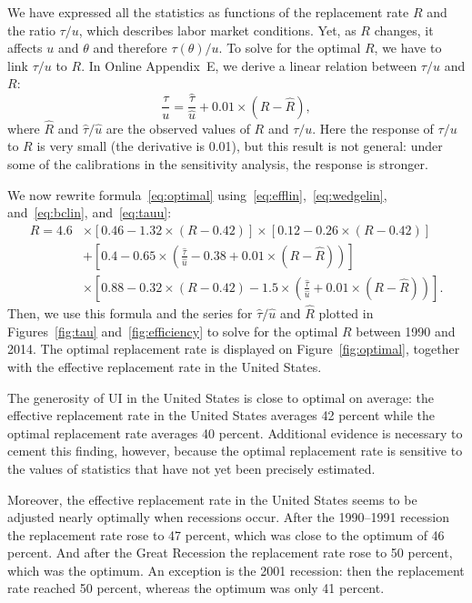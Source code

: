 \documentclass[letterpaper,12pt,leqno]{article}
\newcommand{\pre}[1]{\left( #1 \right)}
\newcommand{\brk}[1]{\left[ #1 \right]}
\def \t{{\theta}}
\begin{document}
We have expressed all the statistics as functions of the replacement rate $R$ and the ratio $\tau/u$, which describes labor market conditions. Yet, as $R$ changes, it affects $u$ and $\t$ and therefore $\tau(\t)/u$. To solve for the optimal $R$, we have to link $\tau/u$ to $R$. In Online Appendix~E, we derive a linear relation between $\tau/u$ and $R$:
\begin{equation}
\frac{\tau}{u}=\frac{\hat{\tau}}{\hat{u}} + 0.01 \times \pre{R-\hat{R}},
\label{eq:tauu}\end{equation}
where $\hat{R}$ and $\hat{\tau}/\hat{u}$ are the observed values of $R$ and $\tau/u$. Here the response of $\tau/u$ to $R$ is very small (the derivative is 0.01), but this result is not general: under some of the calibrations in the sensitivity analysis, the response is stronger.

We now rewrite formula~\eqref{eq:optimal} using~\eqref{eq:efflin},~\eqref{eq:wedgelin}, and~\eqref{eq:bclin}, and~\eqref{eq:tauu}: 
\begin{align}
R  = 4.6 &\times \brk{0.46-1.32\times (R-0.42)} \times \brk{0.12-0.26\times (R-0.42)}\label{eq:formula}\\
&+\brk{0.4-0.65 \times \pre{\frac{\hat{\tau}}{\hat{u}}-0.38+ 0.01 \times \pre{R-\hat{R}}}}\nonumber\\
&\times \brk{0.88-0.32\times (R-0.42)-1.5\times \pre{\frac{\hat{\tau}}{\hat{u}} + 0.01 \times \pre{R-\hat{R}}}}.\nonumber
\end{align}
Then, we use this formula and the series for $\hat{\tau}/\hat{u}$ and $\hat{R}$ plotted in Figures~\ref{fig:tau} and~\ref{fig:efficiency} to solve for the optimal $R$ between 1990 and 2014. The optimal replacement rate is displayed on Figure~\ref{fig:optimal}, together with the effective replacement rate in the United States. 

The generosity of UI in the United States is close to optimal on average: the effective replacement rate in the United States averages 42 percent while the optimal replacement rate averages 40 percent. Additional evidence is necessary to cement this finding, however, because the optimal replacement rate is sensitive to the values of statistics that have not yet been precisely estimated.

Moreover, the effective replacement rate in the United States seems to be adjusted nearly optimally when recessions occur. After the 1990--1991 recession the replacement rate rose to 47 percent, which was close to the optimum of 46 percent. And after the Great Recession the replacement rate rose to 50 percent, which was the optimum. An exception is the 2001 recession: then the replacement rate reached 50 percent, whereas the optimum was only 41 percent.
\end{document}
